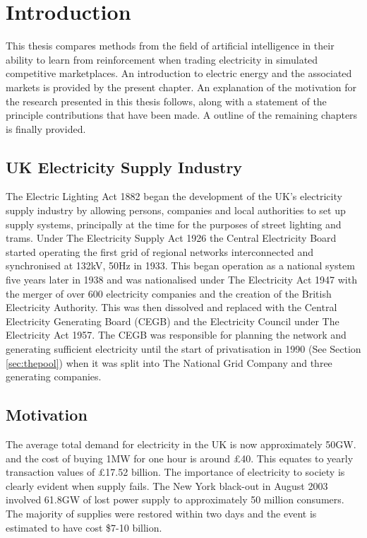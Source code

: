 \chapter{Introduction}
This thesis compares methods from the field of artificial intelligence in their
ability to learn from reinforcement when trading electricity in simulated
competitive marketplaces.  An introduction to electric energy and the
associated markets is provided by the present chapter.  An explanation of the
motivation for the research presented in this thesis follows, along with a
statement of the principle contributions that have been made.  A outline of the
remaining chapters is finally provided.

\section{UK Electricity Supply Industry}
The Electric Lighting Act 1882 began the development of the UK's electricity
supply industry by allowing persons, companies and local authorities to set up
supply systems, principally at the time for the purposes of street lighting and
trams.  Under The Electricity Supply Act 1926 the Central Electricity Board
started operating the first grid of regional networks interconnected and
synchronised at 132kV, 50Hz in 1933.  This began operation as a national system
five years later in 1938 and was nationalised under The Electricity Act 1947
with the merger of over 600 electricity companies and the creation of the
British Electricity Authority.  This was then dissolved and replaced with the
Central Electricity Generating Board (CEGB) and the Electricity Council under
The Electricity Act 1957.  The CEGB was responsible for planning the network
and generating sufficient electricity until the start of privatisation in 1990
(See Section \ref{sec:thepool}) when it was split into The National Grid
Company and three generating companies.

\section{Motivation}

The average total demand for electricity in the UK is now approximately 50GW.
and the cost of buying 1MW for one hour is around \pounds40.  This equates to
yearly transaction values of \pounds17.52 billion.  The importance of electricity to
society is clearly evident when supply fails.  The New York black-out in August
2003 involved 61.8GW of lost power supply to approximately 50 million
consumers.  The majority of supplies were restored within two days and the
event is estimated to have cost \$7-10 billion.

